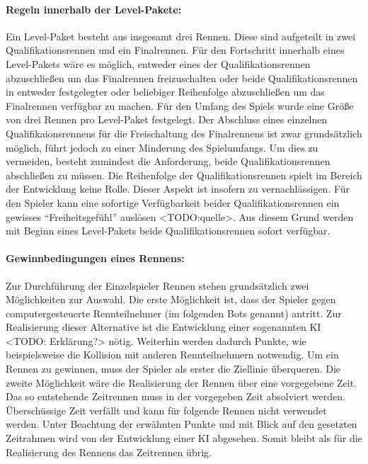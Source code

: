 		\paragraph{Regeln innerhalb der Level-Pakete:}
		Ein Level-Paket besteht aus insgesamt drei Rennen. Diese sind aufgeteilt in zwei Qualifikationsrennen und ein Finalrennen. Für den Fortschritt innerhalb eines Level-Pakets wäre es möglich, entweder eines der Qualifikationsrennen abzuschließen um das Finalrennen freizuschalten oder beide Qualifikationsrennen in entweder festgelegter oder beliebiger Reihenfolge abzuschließen um das Finalrennen verfügbar zu machen.
		Für den Umfang des Spiels wurde eine Größe von drei Rennen pro Level-Paket festgelegt. Der Abschluss eines einzelnen Qualifikaionsrennens für die Freischaltung des Finalrennens ist zwar grundsätzlich möglich, führt jedoch zu einer Minderung des Spielumfangs. Um dies zu vermeiden, besteht zumindest die Anforderung, beide Qualifikationsrennen abschließen zu müssen. Die Reihenfolge der Qualifikationsrennen spielt im Bereich der Entwicklung keine Rolle. Dieser Aspekt ist insofern zu vernachlässigen. Für den Spieler kann eine sofortige Verfügbarkeit beider Qualifikationsrennen ein gewisses \enquote{Freiheitsgefühl} auslösen <TODO:quelle>. Aus diesem Grund werden mit Beginn eines Level-Pakets beide Qualifikationsrennen sofort verfügbar.

		\paragraph{Gewinnbedingungen eines Rennens:}
		Zur Durchführung der Einzelspieler Rennen stehen grundsätzlich zwei Möglichkeiten zur Auswahl. Die erste Möglichkeit ist, dass der Spieler gegen computergesteuerte Rennteilnehmer (im folgenden Bots genannt) antritt. Zur Realisierung dieser Alternative ist die Entwicklung einer sogenannten KI <TODO: Erklärung?> nötig. Weiterhin werden dadurch Punkte, wie beispielsweise die Kollision mit anderen Rennteilnehmern notwendig. Um ein Rennen zu gewinnen, muss der Spieler als erster die Ziellinie überqueren.
		Die zweite Möglichkeit wäre die Realisierung der Rennen über eine vorgegebene Zeit. Das so entstehende Zeitrennen muss in der vorgegeben Zeit absolviert werden. Überschüssige Zeit verfällt und kann für folgende Rennen nicht verwendet werden.
		Unter Beachtung der erwähnten Punkte und mit Blick auf den gesetzten Zeitrahmen wird von der Entwicklung einer KI abgesehen. Somit bleibt als für die Realisierung des Rennens das Zeitrennen übrig.

